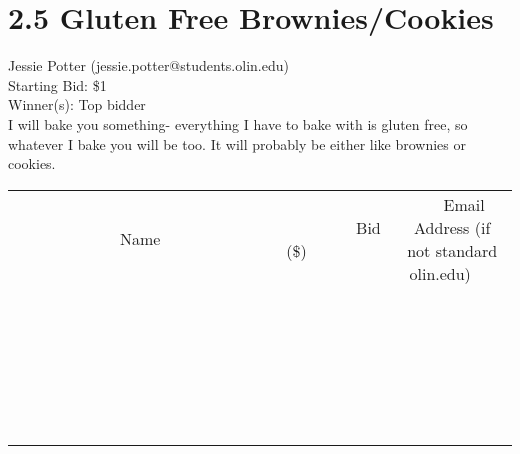 \documentclass[11pt]{article}
\begin{document}
\section*{2.5 Gluten Free Brownies/Cookies}
Jessie Potter (jessie.potter@students.olin.edu) \\
Starting Bid: \$1 \\
Winner(s): 
Top bidder \\
I will bake you something- everything I have to bake with is gluten free, so whatever I bake you will be too. It will probably be either like brownies or cookies. \\[6ex]
\begin{tabular}{c c c}
~~~~~~~~~~~~~Name~~~~~~~~~~~~~ & ~~~~~~~~~Bid (\$)~~~~~~~~~ & ~~~Email Address (if not standard olin.edu)~~~ \\
 & & \\
\hline
 & & \\
\hline
 & & \\
\hline
 & & \\
\hline
 & & \\
\hline
 & & \\
\hline
 & & \\
\hline
 & & \\
\hline
 & & \\
\hline
 & & \\
\hline
 & & \\
\hline
 & & \\
\hline
 & & \\
\hline
 & & \\
\hline
 & & \\
\hline
 & & \\
\hline
 & & \\
\hline
 & & \\
\hline
 & & \\
\hline
 & & \\
\hline
 & & \\
\hline
 & & \\
\hline
 & & \\
\hline
 & & \\
\hline
 & & \\
\hline
 & & \\
\hline
\end{tabular}
\clearpage
\end{document}
